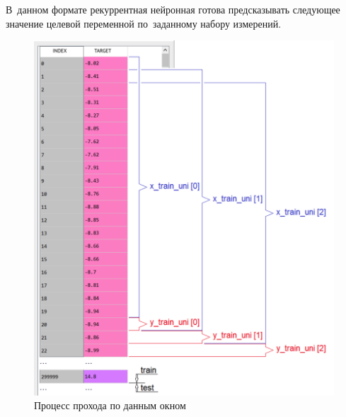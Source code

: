 В~данном формате рекуррентная нейронная готова предсказывать следующее значение 
целевой переменной по~заданному набору измерений.

\begin{figure}[h]
	\centering
	\includegraphics[width=\textwidth, clip, trim={1cm 0 1.2cm 0}]{pics/data_window}
	\caption{Процесс прохода по данным окном}
	\label{data_window}
\end{figure}


